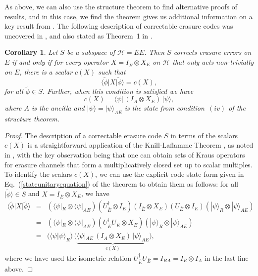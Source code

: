 \documentclass[11pt]{amsart}
\newtheorem{cor}[thm]{Corollary}
\theoremstyle{definition}
\theoremstyle{definition}
\theoremstyle{definition}
\newcommand{\1}{\mathbb{I}}
\def\ket#1{| #1 \rangle}
\def\bra#1{\langle #1 |}
\begin{document}
As above, we can also use the structure theorem to find alternative proofs of results, and in this case, we find the theorem gives us additional information on a key result from \cite{cleve1999share,gottesman2000theory}. The following description of correctable erasure codes was uncovered in \cite{cleve1999share}, and also stated as Theorem~1 in \cite{gottesman2000theory}. 

\begin{cor}\label{correctablecor}
    Let $S$ be a subspace of $\mathcal H = \overline{E} E$. Then $S$ corrects erasure errors on $E$ if and only if for every operator $X = I_{\overline{E}} \otimes X_E$ on $\mathcal H$ that only acts non-trivially on $E$, there is a scalar $c(X)$ such that 
    \[
    \bra{\widetilde{\phi}} X \ket{\widetilde{\phi}} = c(X), 
    \]
    for all $\widetilde{\phi}\in S$. Further, when this condition is satisfied we have 
    \[
    c(X) =  \bra{\psi} \, (I_A \otimes X_E) \,   \ket{\psi} , 
    \]
    where $A$ is the ancilla and $\ket{\psi} = \ket{\psi}_{AE}$ is the state from condition~$(iv)$ of the structure theorem. 
\end{cor}

\begin{proof} 
The description of a correctable erasure code $S$ in terms of the scalars $c(X)$ is a straightforward application of the Knill-Laflamme Theorem \cite{knill1997theory}, as noted in \cite{cleve1999share,gottesman2000theory}, with the key observation being that one can obtain sets of Kraus operators for erasure channels that form a multiplicatively closed set up to scalar multiples. To identify the scalars $c(X)$, we can use the explicit code state form given in Eq.~(\ref{stateunitaryequation}) of the theorem to obtain them as follows: for all $\ket{\widetilde{\phi}}\in S$ and $X = I_{\overline{E}} \otimes X_E$, we have 
\begin{eqnarray*}
     \bra{\widetilde{\phi}} X \ket{\widetilde{\phi}} &=& 
     (\bra{\psi}_R \otimes \bra{\psi}_{AE} ) ( U_{\overline{E}}^\dagger \otimes I_E ) (I_{\overline{E}} \otimes X_E)  ( U_{\overline{E}} \otimes I_E ) (\ket{\psi}_R \otimes \ket{\psi}_{AE} ) \\ 
     &=& 
     (\bra{\psi}_R \otimes \bra{\psi}_{AE} ) ( U_{\overline{E}}^\dagger U_{\overline{E}} \otimes X_E )  (\ket{\psi}_R \otimes \ket{\psi}_{AE} ) \\ 
     &=& \big( \langle \psi |  \psi \rangle_R \big) \, \big(  \underbrace{\bra{\psi}_{AE} \, (I_A \otimes X_E) \,  \ket{\psi}_{AE}}_{c(X)} \big) ,  
\end{eqnarray*}
where we have used the isometric relation $U_{\overline{E}}^\dagger U_{\overline{E}}= I_{RA} = I_R \otimes I_A$ in the last line above. 
\end{proof} 
\end{document}
